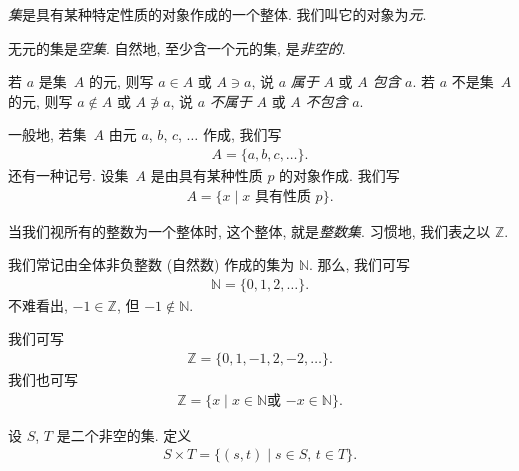 \begin{definition}
    \emph{集}是具有某种特定性质的对象作成的一个整体.
    我们叫它的对象为\emph{元}.

    无元的集是\emph{空集}.
    自然地, 至少含一个元的集, 是\emph{非空的}.

    若 \(a\) 是集~\(A\) 的元,
    则写 \(a \in A\) 或 \(A \ni a\),
    说 \(a\) \emph{属于} \(A\)
    或 \(A\) \emph{包含} \(a\).
    若 \(a\) 不是集~\(A\) 的元,
    则写 \(a \notin A\) 或 \(A \not\ni a\),
    说 \(a\) \emph{不属于} \(A\)
    或 \(A\) \emph{不包含} \(a\).

    一般地, 若集~\(A\) 由元 \(a\), \(b\), \(c\), \(\dots\) 作成,
    我们写
    \begin{align*}
        A = \{ a,b,c,\dots \}.
    \end{align*}
    还有一种记号.
    设集~\(A\) 是由具有某种性质 \(p\) 的对象作成.
    我们写
    \begin{align*}
        A = \{ x \mid \text{\(x\) 具有性质 \(p\)} \}.
    \end{align*}
\end{definition}

\begin{example}
    当我们视所有的整数为一个整体时,
    这个整体, 就是\emph{整数集}.
    习惯地, 我们表之以 \(\mathbb{Z}\).

    我们常记由全体非负整数 (自然数) 作成的集为 \(\mathbb{N}\).
    那么, 我们可写
    \begin{align*}
        \mathbb{N} = \{ 0, 1, 2, \dots \}.
    \end{align*}
    不难看出, \(-1 \in \mathbb{Z}\),
    但 \(-1 \notin \mathbb{N}\).

    我们可写
    \begin{align*}
        \mathbb{Z} = \{ 0, 1, -1, 2, -2, \dots \}.
    \end{align*}
    我们也可写
    \begin{align*}
        \mathbb{Z} =
        \{ x \mid \text{\(x \in \mathbb{N}\)
            或 \(-x \in \mathbb{N}\)} \}.
    \end{align*}
\end{example}

\begin{definition}
    设 \(S\), \(T\) 是二个非空的集.
    定义
    \begin{align*}
        S \times T
        = \{ (s, t) \mid \text{\(s \in S\), \(t \in T\)} \}.
    \end{align*}
\end{definition}

